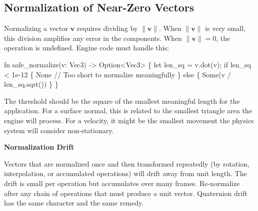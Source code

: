 \documentclass[
  11pt,
  letterpaper,
  DIV=11,
  numbers=noendperiod,
  twoside,
  open=right]{scrreprt}
\newenvironment{Shaded}{}{}
\newcommand{\CommentTok}[1]{\textcolor[rgb]{0.42,0.45,0.49}{#1}}
\newcommand{\ConstantTok}[1]{\textcolor[rgb]{0.00,0.36,0.77}{#1}}
\newcommand{\ControlFlowTok}[1]{\textcolor[rgb]{0.84,0.23,0.29}{#1}}
\newcommand{\DataTypeTok}[1]{\textcolor[rgb]{0.84,0.23,0.29}{#1}}
\newcommand{\DecValTok}[1]{\textcolor[rgb]{0.00,0.36,0.77}{#1}}
\newcommand{\KeywordTok}[1]{\textcolor[rgb]{0.84,0.23,0.29}{#1}}
\newcommand{\NormalTok}[1]{\textcolor[rgb]{0.14,0.16,0.18}{#1}}
\newcommand{\OperatorTok}[1]{\textcolor[rgb]{0.14,0.16,0.18}{#1}}
\renewenvironment{Shaded}{\begin{snugshade}\small\setstretch{0.95}}{\end{snugshade}}
\begin{document}
\subsection{Normalization of Near-Zero
Vectors}\label{normalization-of-near-zero-vectors}

Normalizing a vector \(\mathbf{v}\) requires dividing by
\(\|\mathbf{v}\|\). When \(\|\mathbf{v}\|\) is very small, this division
amplifies any error in the components. When \(\|\mathbf{v}\| = 0\), the
operation is undefined. Engine code must handle this:

\begin{Shaded}
\begin{Highlighting}[]
\KeywordTok{fn}\NormalTok{ safe\_normalize(v}\OperatorTok{:}\NormalTok{ Vec3) }\OperatorTok{{-}\textgreater{}} \DataTypeTok{Option}\OperatorTok{\textless{}}\NormalTok{Vec3}\OperatorTok{\textgreater{}} \OperatorTok{\{}
    \KeywordTok{let}\NormalTok{ len\_sq }\OperatorTok{=}\NormalTok{ v}\OperatorTok{.}\NormalTok{dot(v)}\OperatorTok{;}
    \ControlFlowTok{if}\NormalTok{ len\_sq }\OperatorTok{\textless{}} \DecValTok{1e{-}12} \OperatorTok{\{}
        \ConstantTok{None}  \CommentTok{// Too short to normalize meaningfully}
    \OperatorTok{\}} \ControlFlowTok{else} \OperatorTok{\{}
        \ConstantTok{Some}\NormalTok{(v }\OperatorTok{/}\NormalTok{ len\_sq}\OperatorTok{.}\NormalTok{sqrt())}
    \OperatorTok{\}}
\OperatorTok{\}}
\end{Highlighting}
\end{Shaded}

The threshold should be the square of the smallest meaningful length for
the application. For a surface normal, this is related to the smallest
triangle area the engine will process. For a velocity, it might be the
smallest movement the physics system will consider non-stationary.

\begin{tcolorbox}[enhanced jigsaw, arc=.35mm, bottomrule=.15mm, breakable, colback=white, colframe=quarto-callout-warning-color-frame, left=2mm, leftrule=.75mm, opacityback=0, rightrule=.15mm, toprule=.15mm]
\begin{minipage}[t]{5.5mm}
\textcolor{quarto-callout-warning-color}{\faExclamationTriangle}
\end{minipage}%
\begin{minipage}[t]{\textwidth - 5.5mm}

\vspace{-3mm}\textbf{Normalization Drift}\vspace{3mm}

Vectors that are normalized once and then transformed repeatedly (by
rotation, interpolation, or accumulated operations) will drift away from
unit length. The drift is small per operation but accumulates over many
frames. Re-normalize after any chain of operations that must produce a
unit vector. Quaternion drift has the same character and the same
remedy.

\end{minipage}%
\end{tcolorbox}
\end{document}
